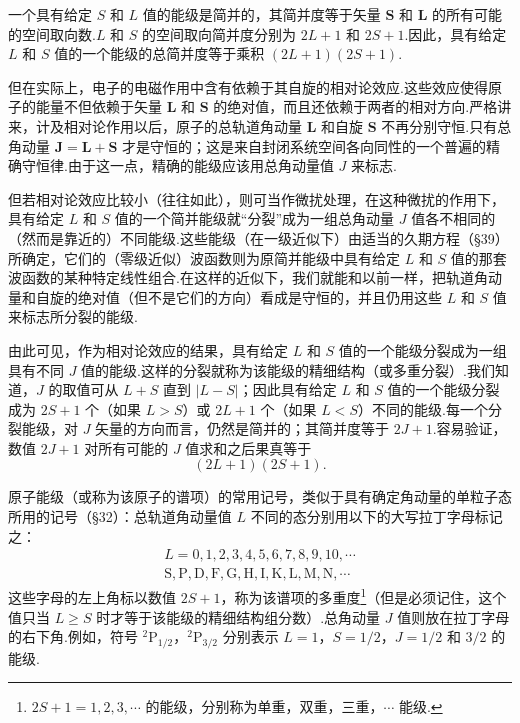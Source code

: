 一个具有给定 $S$ 和 $L$ 值的能级是简并的，其简并度等于矢量 $\boldsymbol{S}$ 和 $\boldsymbol{L}$ 的所有可能的空间取向数.$L$ 和 $S$ 的空间取向简并度分别为 $2L+1$ 和 $2S+1$.因此，具有给定 $L$ 和 $S$ 值的一个能级的总简并度等于乘积 $(2L+1)(2S+1)$.

但在实际上，电子的电磁作用中含有依赖于其自旋的相对论效应.这些效应使得原子的能量不但依赖于矢量 $\boldsymbol{L}$ 和 $\boldsymbol{S}$ 的绝对值，而且还依赖于两者的相对方向.严格讲来，计及相对论作用以后，原子的总轨道角动量 $\boldsymbol{L}$ 和自旋 $\boldsymbol{S}$ 不再分别守恒.只有总角动量 $\boldsymbol{J}=\boldsymbol{L}+\boldsymbol{S}$ 才是守恒的；这是来自封闭系统空间各向同性的一个普遍的精确守恒律.由于这一点，精确的能级应该用总角动量值 $J$ 来标志.

但若相对论效应比较小（往往如此），则可当作微扰处理，在这种微扰的作用下，具有给定 $L$ 和 $S$ 值的一个简并能级就“分裂”成为一组总角动量 $J$ 值各不相同的（然而是靠近的）不同能级.这些能级（在一级近似下）由适当的久期方程（§39）所确定，它们的（零级近似）波函数则为原简并能级中具有给定 $L$ 和 $S$ 值的那套波函数的某种特定线性组合.在这样的近似下，我们就能和以前一样，把轨道角动量和自旋的绝对值（但不是它们的方向）看成是守恒的，并且仍用这些 $L$ 和 $S$ 值来标志所分裂的能级.

由此可见，作为相对论效应的结果，具有给定 $L$ 和 $S$ 值的一个能级分裂成为一组具有不同 $J$ 值的能级.这样的分裂就称为该能级的精细结构（或多重分裂）.我们知道，$J$ 的取值可从 $L+S$ 直到 $|L-S|$；因此具有给定 $L$ 和 $S$ 值的一个能级分裂成为 $2S+1$ 个（如果 $L>S$）或 $2L+1$ 个（如果 $L<S$）不同的能级.每一个分裂能级，对 $J$ 矢量的方向而言，仍然是简并的；其简并度等于 $2J+1$.容易验证，数值 $2J+1$ 对所有可能的 $J$ 值求和之后果真等于
\begin{equation*}
  (2L+1)(2S+1).
\end{equation*}

原子能级（或称为该原子的谱项）的常用记号，类似于具有确定角动量的单粒子态所用的记号（§32）：总轨道角动量值 $L$ 不同的态分别用以下的大写拉丁字母标记之：
\begin{equation*}
\begin{array}{r}
L=0,1,2,3,4,5,6,7,8,9,10,\cdots\\
\mathrm{S},\mathrm{P},\mathrm{D},\mathrm{F},\mathrm{G},\mathrm{H},\mathrm{I},\mathrm{K},\mathrm{L},\mathrm{M},\mathrm{N},\cdots
\end{array}
\end{equation*}
这些字母的左上角标以数值 $2S+1$，称为该谱项的多重度\footnote{$2S+1=1,2,3,\cdots$ 的能级，分别称为单重，双重，三重，$\cdots$ 能级.}（但是必须记住，这个值只当 $L\geqslant S$ 时才等于该能级的精细结构组分数）.总角动量 $J$ 值则放在拉丁字母的右下角.例如，符号 ${}^{2}\mathrm{P}_{1/2}$，${}^{2}\mathrm{P}_{3/2}$ 分别表示 $L=1$，$S=1/2$，$J=1/2$ 和 $3/2$ 的能级.


